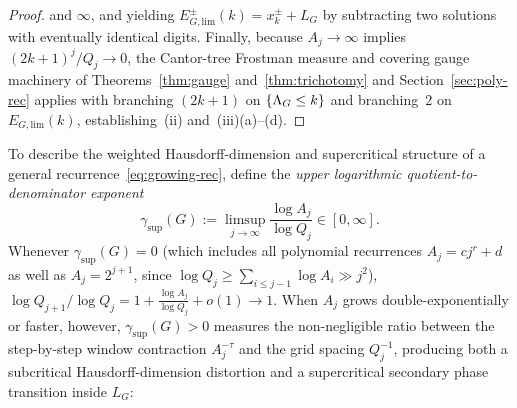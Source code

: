 \begin{proof}
and $\infty$, and yielding $E_{G,\mathrm{lim}}^\pm(k)=x_k^\pm+L_G$ by subtracting
two solutions with eventually identical digits. Finally, because $A_j\to\infty$
implies $(2k+1)^j/Q_j\to0$, the Cantor-tree Frostman measure and covering gauge
machinery of Theorems~\ref{thm:gauge} and~\ref{thm:trichotomy} and Section~\ref{sec:poly-rec}
applies with branching $(2k+1)$ on $\{\Lambda_G\le k\}$ and branching~$2$ on
$E_{G,\mathrm{lim}}(k)$, establishing~(ii) and~(iii)(a)--(d).
\end{proof}

To describe the weighted Hausdorff-dimension and supercritical structure of a
general recurrence~\eqref{eq:growing-rec}, define the \emph{upper logarithmic
quotient-to-denominator exponent}
\begin{equation}\label{eq:gamma-sup}
\gamma_{\sup}(G):=\limsup_{j\to\infty}\frac{\log A_j}{\log Q_j}\in[0,\infty].
\end{equation}
Whenever $\gamma_{\sup}(G)=0$ (which includes all polynomial recurrences
$A_j=cj^r+d$ as well as $A_j=2^{j+1}$, since $\log Q_j\ge\sum_{i\le j-1}\log A_i\gg j^2$),
$\log Q_{j+1}/\log Q_j=1+\frac{\log A_j}{\log Q_j}+o(1)\to1$. When $A_j$ grows
double-exponentially or faster, however, $\gamma_{\sup}(G)>0$ measures the
non-negligible ratio between the step-by-step window contraction $A_j^{-\tau}$ and
the grid spacing $Q_j^{-1}$, producing both a subcritical Hausdorff-dimension
distortion and a supercritical secondary phase transition inside $L_G$:


